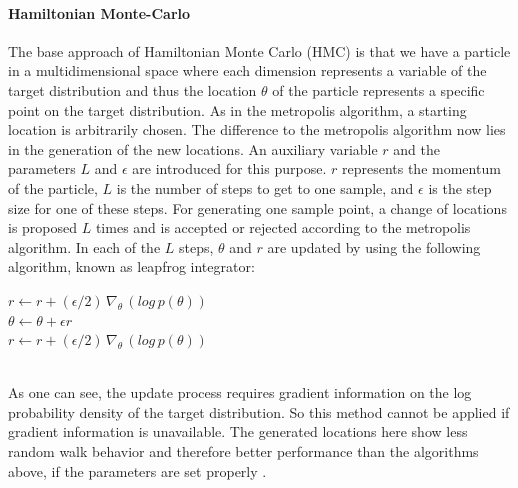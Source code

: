 \documentclass{article}
\begin{document}
\paragraph{Hamiltonian Monte-Carlo}
The base approach of Hamiltonian Monte Carlo (HMC) is that we have a particle in a multidimensional space where each dimension represents a variable of the target distribution and thus the location $\theta$ of the particle represents a specific point on the target distribution. As in the metropolis algorithm, a starting location is arbitrarily chosen. The difference to the metropolis algorithm now lies in the generation of the new locations. An auxiliary variable $r$ and the parameters $L$ and $\epsilon$ are introduced for this purpose. $r$ represents the momentum of the particle, $L$ is the number of steps to get to one sample, and $\epsilon$ is the step size for one of these steps. For generating one sample point, a change of locations is proposed $L$ times and is accepted or rejected according to the metropolis algorithm. In each of the $L$ steps, $\theta$ and $r$ are updated by using the following algorithm, known as leapfrog integrator: 
\begin{algorithm}[h]
	$r \leftarrow r + (\epsilon/2)  \, \nabla_\theta \, (log \, p(\theta))$\\
	$\theta \leftarrow \theta + \epsilon r$\\
	$r \leftarrow r + (\epsilon/2) \, \nabla_\theta \, (log \, p(\theta))$
\end{algorithm}
\\ 
As one can see, the update process requires gradient information on the log probability density of the target distribution. So this method cannot be applied if gradient information is unavailable. The generated locations here show less random walk behavior and therefore better performance than the algorithms above, if the parameters are set properly \cite{hoffman2014no}.




\end{document}
